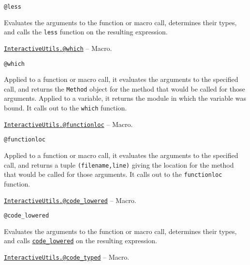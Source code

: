 \begin{adjustwidth}{2em}{0pt}


\begin{verbatim}
@less
\end{verbatim}

Evaluates the arguments to the function or macro call, determines their types, and calls the \texttt{less} function on the resulting expression.



\end{adjustwidth}
\hypertarget{5196080466457876497}{} 
\hyperlink{5196080466457876497}{\texttt{InteractiveUtils.@which}}  -- {Macro.}

\begin{adjustwidth}{2em}{0pt}


\begin{verbatim}
@which
\end{verbatim}

Applied to a function or macro call, it evaluates the arguments to the specified call, and returns the \texttt{Method} object for the method that would be called for those arguments. Applied to a variable, it returns the module in which the variable was bound. It calls out to the \texttt{which} function.



\end{adjustwidth}
\hypertarget{12812718888833665191}{} 
\hyperlink{12812718888833665191}{\texttt{InteractiveUtils.@functionloc}}  -- {Macro.}

\begin{adjustwidth}{2em}{0pt}


\begin{verbatim}
@functionloc
\end{verbatim}

Applied to a function or macro call, it evaluates the arguments to the specified call, and returns a tuple \texttt{(filename,line)} giving the location for the method that would be called for those arguments. It calls out to the \texttt{functionloc} function.



\end{adjustwidth}
\hypertarget{1376948972689074219}{} 
\hyperlink{1376948972689074219}{\texttt{InteractiveUtils.@code\_lowered}}  -- {Macro.}

\begin{adjustwidth}{2em}{0pt}


\begin{verbatim}
@code_lowered
\end{verbatim}

Evaluates the arguments to the function or macro call, determines their types, and calls \hyperlink{18235967286596219009}{\texttt{code\_lowered}} on the resulting expression.



\end{adjustwidth}
\hypertarget{6823997547688846780}{} 
\hyperlink{6823997547688846780}{\texttt{InteractiveUtils.@code\_typed}}  -- {Macro.}

